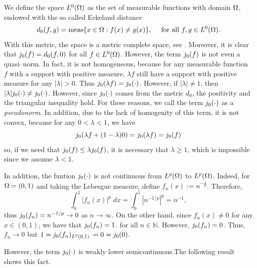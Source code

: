 We define the space $L^0(\Omega)$ as the set of measurable functions with domain
$\Omega$, endowed with the so called Eckeland distance
\begin{equation}\label{eq:Eckeland}
	d_0(f,g)=\text{meas}\{x\in\Omega: f(x)\neq g(x)\}, \quad \text{ for all }f, g\in L^0(\Omega).
\end{equation}
With this metric, the space is a metric complete space, see \cite{ito-kunisch2014}. 
Moreover, it is clear that $j_0(f)=d_0(f,0)$ for all $f\in L^0(\Omega)$.
However, the term $j_0(f)$ is not even a quasi--norm. In fact,
it is not homogeneous, because for any measurable function $f$ with a support with positive measure,
$\lambda f$ still have a support with positive measure for any $|\lambda|>0$. Thus 
$j_0(\lambda f)=j_0(\cdot)$. However, if $|\lambda|\ne 1$, then
$|\lambda|j_0(\cdot)\ne j_0(\cdot)$. However, since $j_0(\cdot)$
comes from the metric $d_0$, the positivity and the triangular inequality hold. For these
reasons, we call the term $j_0(\cdot)$ as a \textit{pseudonorm}. In addition,
due to the lack of homogenity of this term, it is not convex, because for any 
$0<\lambda<1$, we have 
\[
j_0(\lambda f+(1-\lambda)0)=j_0(\lambda f)=j_0(f)
\]
so, if we need that $j_0(f)\le \lambda j_0(f)$, it is 
necessary that $\lambda\ge 1$, which is impossible since we assume $\lambda<1$. 

In addition, the funtion $j_0(\cdot)$ is not 
continuous from $L^p(\Omega)$ to $L^p(\Omega)$. Indeed, for $\Omega=(0,1)$ and taking
the Lebesgue measure, define $f_n(x):=n^{-\frac{1}{p}}$. Therefore, 
\[
\int_{0}^{1}|f_n(x)|^p\; dx = \int_{0}^{1}|n^{-1/p}|^p=n^{-1},
\]
thus $j_0(f_n)=n^{-1/p}\to 0$ as $n\to \infty$. On the other hand, since 
$f_n(x)\ne 0$ for any $x\in (0,1)$, we have that $j_0(f_n)=1$.
for all $n\in \mathbb{N}$. However, $j_0(f_n)=0$. Thus, 
$f_n\to 0$ but $1=j_0(f_n)_{L^0(0,1)}\nrightarrow 0=j_0(0)$.

However, the term $j_0(\cdot)$ is weakly lower semicontinuous.The 
following result shows this fact.

